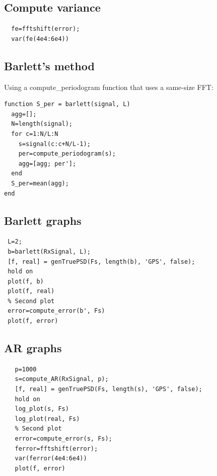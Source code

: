 \documentclass[conference,9pt]{IEEEtran}
\begin{document}
\subsection{Compute variance}
\begin{verbatim}
  fe=fftshift(error);
  var(fe(4e4:6e4))
\end{verbatim}

\subsection{Barlett's method}
Using a compute\_periodogram function that uses a same-size FFT:
\begin{verbatim}
function S_per = barlett(signal, L)
  agg=[];
  N=length(signal);
  for c=1:N/L:N
    s=signal(c:c+N/L-1);
    per=compute_periodogram(s);
    agg=[agg; per'];
  end
  S_per=mean(agg);
end
\end{verbatim}

\subsection{Barlett graphs}
\begin{verbatim}
 L=2;
 b=barlett(RxSignal, L);
 [f, real] = genTruePSD(Fs, length(b), 'GPS', false);
 hold on
 plot(f, b)
 plot(f, real)
 % Second plot
 error=compute_error(b', Fs)
 plot(f, error)
\end{verbatim}


\subsection{AR graphs}
\begin{verbatim}
   p=1000
   s=compute_AR(RxSignal, p);
   [f, real] = genTruePSD(Fs, length(s), 'GPS', false);
   hold on
   log_plot(s, Fs)
   log_plot(real, Fs)
   % Second plot
   error=compute_error(s, Fs);
   ferror=fftshift(error);
   var(ferror(4e4:6e4))
   plot(f, error)
\end{verbatim}
\end{document}
